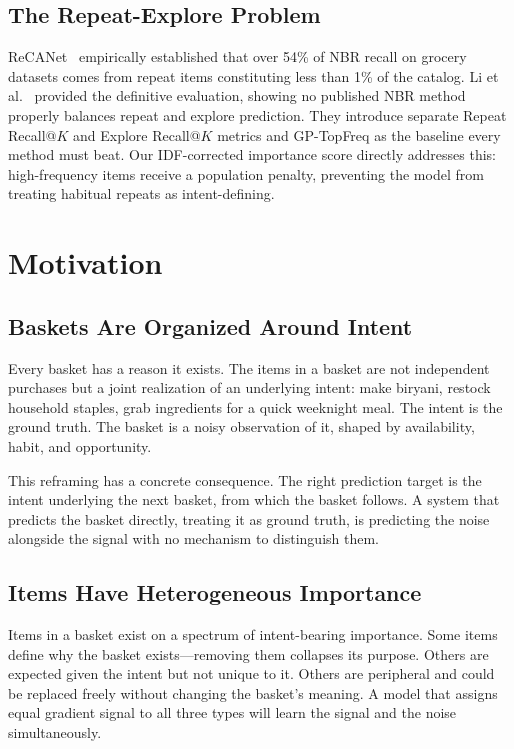 \documentclass[conference]{IEEEtran}
\begin{document}
\subsection{The Repeat-Explore Problem}

ReCANet~\cite{ariannezhad2022recanet} empirically established that
over 54\% of NBR recall on grocery datasets comes from repeat items
constituting less than 1\% of the catalog. Li et al.~\cite{li2023next}
provided the definitive evaluation, showing no published NBR method
properly balances repeat and explore prediction. They introduce separate
Repeat Recall@$K$ and Explore Recall@$K$ metrics and GP-TopFreq as the
baseline every method must beat. Our IDF-corrected importance score
directly addresses this: high-frequency items receive a population
penalty, preventing the model from treating habitual repeats as
intent-defining.


\section{Motivation}
\label{sec:motivation}

\subsection{Baskets Are Organized Around Intent}

Every basket has a reason it exists. The items in a basket are not
independent purchases but a joint realization of an underlying intent:
make biryani, restock household staples, grab ingredients for a quick
weeknight meal. The intent is the ground truth. The basket is a noisy
observation of it, shaped by availability, habit, and opportunity.

This reframing has a concrete consequence. The right prediction target
is the intent underlying the next basket, from which the basket follows.
A system that predicts the basket directly, treating it as ground truth,
is predicting the noise alongside the signal with no mechanism to
distinguish them.

\subsection{Items Have Heterogeneous Importance}

Items in a basket exist on a spectrum of intent-bearing importance.
Some items define why the basket exists---removing them collapses its
purpose. Others are expected given the intent but not unique to it.
Others are peripheral and could be replaced freely without changing the
basket's meaning. A model that assigns equal gradient signal to all
three types will learn the signal and the noise simultaneously.
\end{document}
